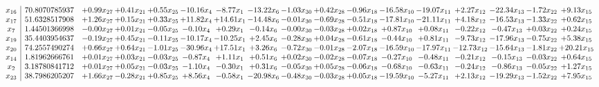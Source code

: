 \documentclass[9pt]{article}
\begin{document}
 \[\begin{array}{c| c c@{\hskip 2pt} c@{\hskip 2pt} c@{\hskip 2pt} c@{\hskip 2pt} c@{\hskip 2pt} c@{\hskip 2pt} c@{\hskip 2pt} c@{\hskip 2pt} c@{\hskip 2pt} c@{\hskip 2pt} c@{\hskip 2pt} c@{\hskip 2pt} c@{\hskip 2pt} c@{\hskip 2pt} c@{\hskip 2pt} }
 x_{16}   &  70.8070785937 & +  0.99 x_{27} & +  0.41 x_{21} & +  0.55 x_{25} & -10.16 x_{4} & -8.77 x_{1} & -13.22 x_{6} & -1.03 x_{30} & +  0.42 x_{28} & -0.96 x_{18} & -16.58 x_{10} & -19.07 x_{11} & +  2.27 x_{12} & -22.34 x_{13} & -1.72 x_{22} & +  9.13 x_{15}\\
 x_{17}   &  51.6328517908 & +  1.26 x_{27} & +  0.15 x_{21} & +  0.33 x_{25} & + 11.82 x_{4} & + 14.61 x_{1} & -14.48 x_{6} & -0.01 x_{30} & -0.69 x_{28} & -0.51 x_{18} & -17.81 x_{10} & -21.11 x_{11} & +  4.18 x_{12} & -16.53 x_{13} & -1.33 x_{22} & +  0.62 x_{15}\\
 x_{7}   &  1.44501366998 & -0.00 x_{27} & +  0.01 x_{21} & -0.05 x_{25} & -0.10 x_{4} & +  0.29 x_{1} & -0.14 x_{6} & -0.00 x_{30} & -0.03 x_{28} & +  0.02 x_{18} & +  0.87 x_{10} & +  0.08 x_{11} & -0.22 x_{12} & -0.47 x_{13} & +  0.03 x_{22} & +  0.24 x_{15}\\
 x_{19}   &  35.4403954637 & -0.19 x_{27} & +  0.45 x_{21} & -0.11 x_{25} & -10.17 x_{4} & -10.25 x_{1} & +  2.45 x_{6} & -0.28 x_{30} & +  0.04 x_{28} & -0.61 x_{18} & -0.44 x_{10} & +  0.81 x_{11} & -9.73 x_{12} & -17.96 x_{13} & -0.75 x_{22} & +  5.38 x_{15}\\
 x_{20}   &  74.2557490274 & +  0.66 x_{27} & +  0.64 x_{21} & -1.01 x_{25} & -30.96 x_{4} & + 17.51 x_{1} & +  3.26 x_{6} & -0.72 x_{30} & -0.01 x_{28} & -2.07 x_{18} & -16.59 x_{10} & -17.97 x_{11} & -12.73 x_{12} & -15.64 x_{13} & -1.81 x_{22} & + 20.21 x_{15}\\
 x_{14}   &  1.81962666761 & +  0.01 x_{27} & +  0.03 x_{21} & -0.03 x_{25} & -0.87 x_{4} & +  1.11 x_{1} & +  0.51 x_{6} & +  0.02 x_{30} & -0.02 x_{28} & -0.07 x_{18} & -0.27 x_{10} & -0.48 x_{11} & -0.21 x_{12} & -0.15 x_{13} & -0.03 x_{22} & +  0.64 x_{15}\\
 x_{2}   &  3.18780841712 & +  0.01 x_{27} & +  0.05 x_{21} & -0.03 x_{25} & -1.10 x_{4} & -0.30 x_{1} & +  0.31 x_{6} & -0.05 x_{30} & +  0.05 x_{28} & -0.06 x_{18} & -0.68 x_{10} & -0.63 x_{11} & -0.24 x_{12} & -0.86 x_{13} & -0.05 x_{22} & +  1.27 x_{15}\\
 x_{23}   &  38.7986205207 & +  1.66 x_{27} & -0.28 x_{21} & +  0.85 x_{25} & +  8.56 x_{4} & -0.58 x_{1} & -20.98 x_{6} & -0.48 x_{30} & -0.03 x_{28} & +  0.05 x_{18} & -19.59 x_{10} & -5.27 x_{11} & +  2.13 x_{12} & -19.29 x_{13} & -1.52 x_{22} & +  7.95 x_{15}\\

\end{array}\]
\end{document}
